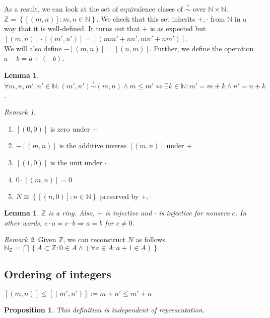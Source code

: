 \documentclass{article}
\newcommand\N{\ensuremath{\mathbb{N}}}
\newcommand\Z{\ensuremath{\mathbb{Z}}}
\newcommand\pr{\stackrel{+}{\sim}}
\newtheorem{lemma}[theorem]{Lemma}
\theoremstyle{definition}
\theoremstyle{remark}
\newtheorem*{remark}{Remark}
\theoremstyle{plain}
\newtheorem{prop}{Proposition}[subsection]
\begin{document}
As a result, we can look at the set of equivalence clases of \(\pr\) over \(\N \times \N\). 
\(\Z = \left\{ [(m,n)]:m,n \in \N \right\}\). We check that this set inherits \(+, \cdot\) from \(\N\)
in a way that it is well-defined. It turns out that \(+\) is as expected but \([(m,n)]\cdot[(m', n')] = 
[(mm' + nn', mn' + nm')]\).\\

We will also define \(-[(m,n)] = [(n,m)]\). Further, we define the operation \(a-b = a + (-b)\).

\begin{lemma}
    \(\forall m,n,m',n' \in \N: (m',n') \pr (m,n) \land m \leq m' \iff \exists k \in \N: m' = m + k \land n' = n +k\).
\end{lemma}

\begin{remark}
    \begin{enumerate}
        \item \([(0,0)]\) is zero under \(+\)
        \item \(-[(m,n)]\) is the additive inverse \([(m,n)]\) under \(+\)
        \item \([(1,0)]\) is the unit under \(\cdot\)
        \item \(0\cdot [(m,n)] = 0\)
        \item \(N \cong \left\{ [(n,0)] : n \in \N \right\}\) preserved by \(+, \cdot\)
    \end{enumerate}
\end{remark}

\begin{lemma}
    \(\Z\) is a ring. Also, \(+\) is injective and \(\cdot\) is injective for nonzero \(c\). In other words, 
    \(c\cdot a = c\cdot b \Rightarrow a = b\) for \(c\neq 0\).
\end{lemma}

\begin{remark}
    Given \(\Z\), we can reconstruct \(N\) as follows. \(\N_{\Z} = \bigcap \left\{ A\subset \Z: 0 \in A \land (\forall a \in A: a+1 \in A) \right\}\)
\end{remark}

\subsection{Ordering of integers}

\([(m,n)] \leq [(m',n')] := m + n' \leq m' + n\)\\

\begin{prop}
    This definition is independent of representation.
\end{prop}
\end{document}
